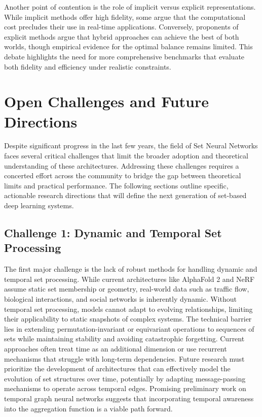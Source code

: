 \documentclass{article}
\begin{document}
Another point of contention is the role of implicit versus explicit representations. While implicit methods offer high fidelity, some argue that the computational cost precludes their use in real-time applications. Conversely, proponents of explicit methods argue that hybrid approaches can achieve the best of both worlds, though empirical evidence for the optimal balance remains limited. This debate highlights the need for more comprehensive benchmarks that evaluate both fidelity and efficiency under realistic constraints.

\section{Open Challenges and Future Directions}

\label{sec:open_challenges_and_future_directions}

Despite significant progress in the last few years, the field of Set Neural Networks faces several critical challenges that limit the broader adoption and theoretical understanding of these architectures. Addressing these challenges requires a concerted effort across the community to bridge the gap between theoretical limits and practical performance. The following sections outline specific, actionable research directions that will define the next generation of set-based deep learning systems.

\subsection{Challenge 1: Dynamic and Temporal Set Processing}

\label{sec:challenge_1_dynamic_and_temporal_set_pro}

The first major challenge is the lack of robust methods for handling dynamic and temporal set processing. While current architectures like AlphaFold 2 and NeRF assume static set membership or geometry, real-world data such as traffic flow, biological interactions, and social networks is inherently dynamic. Without temporal set processing, models cannot adapt to evolving relationships, limiting their applicability to static snapshots of complex systems. The technical barrier lies in extending permutation-invariant or equivariant operations to sequences of sets while maintaining stability and avoiding catastrophic forgetting. Current approaches often treat time as an additional dimension or use recurrent mechanisms that struggle with long-term dependencies. Future research must prioritize the development of architectures that can effectively model the evolution of set structures over time, potentially by adapting message-passing mechanisms to operate across temporal edges. Promising preliminary work on temporal graph neural networks suggests that incorporating temporal awareness into the aggregation function is a viable path forward.
\end{document}
